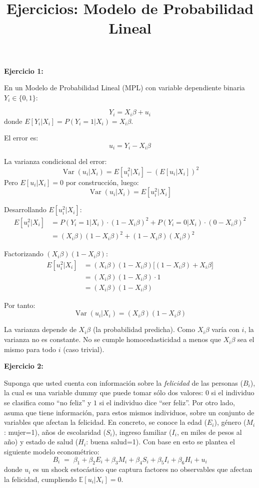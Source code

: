 \documentclass[12pt]{article}
\title{Ejercicios: Modelo de Probabilidad Lineal}
\date{}
\begin{document}
\maketitle


{\bf Ejercicio 1:} 

En un Modelo de Probabilidad Lineal (MPL) con variable dependiente binaria $Y_i \in \{0,1\}$:

\[
Y_i = X_i\beta + u_i
\]
donde $E[Y_i|X_i] = P(Y_i=1|X_i) = X_i\beta$.

El error es:
\[
u_i = Y_i - X_i\beta
\]

La varianza condicional del error:
\[
\operatorname{Var}(u_i|X_i) = E[u_i^2|X_i] - (E[u_i|X_i])^2
\]
Pero $E[u_i|X_i]=0$ por construcción, luego:
\[
\operatorname{Var}(u_i|X_i) = E[u_i^2|X_i]
\]

Desarrollando $E[u_i^2|X_i]$:
\[
\begin{aligned}
E[u_i^2|X_i] &= P(Y_i=1|X_i)\cdot(1 - X_i\beta)^2 + P(Y_i=0|X_i)\cdot(0 - X_i\beta)^2 \\
&= (X_i\beta)(1 - X_i\beta)^2 + (1 - X_i\beta)(X_i\beta)^2
\end{aligned}
\]

Factorizando $(X_i\beta)(1 - X_i\beta)$:
\[
\begin{aligned}
E[u_i^2|X_i] &= (X_i\beta)(1 - X_i\beta)\big[(1 - X_i\beta) + X_i\beta\big] \\
&= (X_i\beta)(1 - X_i\beta) \cdot 1 \\
&= (X_i\beta)(1 - X_i\beta)
\end{aligned}
\]

Por tanto:
\[
\operatorname{Var}(u_i|X_i) = (X_i\beta)(1 - X_i\beta)
\]

La varianza depende de $X_i\beta$ (la probabilidad predicha). Como $X_i\beta$ varía con $i$, la varianza no es constante. No se cumple homocedasticidad a menos que $X_i\beta$ sea el mismo para todo $i$ (caso trivial).

\vspace{0.5cm}
{\bf Ejercicio 2:} 

 

Suponga que usted cuenta con información sobre la \textit{felicidad} de las personas (\(B_i\)), la cual es una variable dummy que puede tomar sólo dos valores: \(0\) si el individuo se clasifica como “no feliz” y \(1\) si el individuo dice “ser feliz”. Por otro lado, asuma que tiene información, para estos mismos individuos, sobre un conjunto de variables que afectan la felicidad. En concreto, se conoce la edad (\(E_i\)), género (\(M_i\): mujer=1), años de escolaridad (\(S_i\)), ingreso familiar (\(I_i\), en miles de pesos al año) y estado de salud (\(H_i\): buena salud=1). Con base en esto se plantea el siguiente modelo econométrico:
\[
B_i \;=\; \beta_1 + \beta_2 E_i + \beta_3 M_i + \beta_4 S_i + \beta_5 I_i + \beta_6 H_i + u_i
\tag{1}
\]
donde \(u_i\) es un shock estocástico que captura factores no observables que afectan la felicidad, cumpliendo \(\mathbb{E}[u_i|X_i]=0\).
\end{document}
